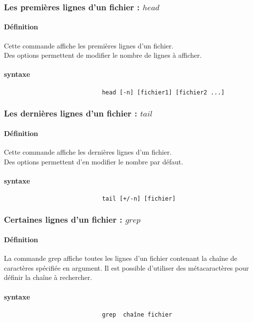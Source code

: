 				\subsubsection{Les premières lignes d'un fichier : $head$}
					\paragraph{Définition}			
						Cette commande affiche les premières lignes d'un fichier.\\
						Des options permettent de modifier le nombre de lignes à afficher.
					\paragraph{syntaxe}					
						\begin{verbatim}
					 		head [-n] [fichier1] [fichier2 ...] 
						\end{verbatim}
			
				\subsubsection{Les dernières lignes d'un fichier : $tail$}
					\paragraph{Définition}			
					Cette commande affiche les dernières lignes   d'un fichier.\\
					Des options permettent d'en modifier le nombre par défaut.
					\paragraph{syntaxe}					
						\begin{verbatim}
					 		tail [+/-n] [fichier]
						\end{verbatim}
							
				\subsubsection{Certaines lignes d'un fichier : $grep$}
					\paragraph{Définition}			
						La commande grep affiche toutes les lignes d'un fichier contenant la chaîne de caractères spécifiée en argument.
						Il est possible d'utiliser des métacaractères  pour définir la chaîne à rechercher.
					\paragraph{syntaxe}					
						\begin{verbatim}
					 		grep  chaîne fichier
						\end{verbatim}
							
